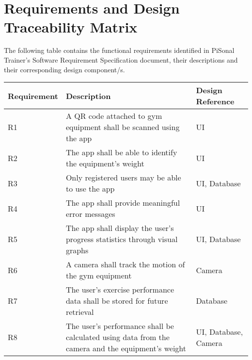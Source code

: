 \documentclass{article}
\begin{document}
\newpage
\section{Requirements and Design Traceability Matrix}
The following table contains the functional requirements identified in PiSonal Trainer's Software Requirement Specification document, their descriptions and their corresponding design component/s.
\begingroup
\begin{center}
\begin{tabular}{| p{2.5cm} | p{7cm} | p{3.5cm} |}
    \hline
    \textbf{Requirement} & \textbf{Description} & \textbf{Design Reference} \\
    \hline
    R1 & A QR code attached to gym equipment shall be scanned using the app & UI \\
    R2 & The app shall be able to identify the equipment’s weight & UI \\
    R3 & Only registered users may be able to use the app & UI, Database\\
    R4 & The app shall provide meaningful error messages & UI \\
    R5 & The app shall display the user’s progress statistics through visual graphs & UI, Database \\
    R6 & A camera shall track the motion of the gym equipment & Camera\\
    R7 & The user’s exercise performance data shall be stored for future retrieval & Database \\
    R8 & The user’s performance shall be calculated using data from the camera and the equipment’s weight & UI, Database, Camera \\
    \hline
\end{tabular}
\end{center}
\endgroup



\end{document}
